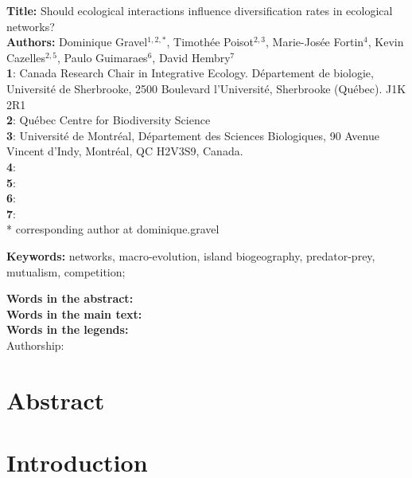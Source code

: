 \documentclass[12pt]{article}
\begin{document}
\linenumbers
\modulolinenumbers[1]

\textbf{Title:} Should ecological interactions influence diversification rates in ecological networks?\\

\textbf{Authors:} Dominique Gravel$^{1,2,*}$, Timothée Poisot$^{2,3}$, Marie-Josée Fortin$^{4}$, Kevin Cazelles$^{2,5}$, Paulo Guimaraes$^{6}$, David Hembry$^{7}$ \\

\textbf{1}: Canada Research Chair in Integrative Ecology. Département de
biologie, Université de Sherbrooke, 2500 Boulevard l'Université,
Sherbrooke (Québec). J1K 2R1\\
\textbf{2}: Québec Centre for Biodiversity Science\\
\textbf{3}: Université de Montréal, Département des Sciences Biologiques, 90 Avenue Vincent d’Indy, Montréal, QC H2V3S9, Canada.\\
\textbf{4}: \\
\textbf{5}: \\
\textbf{6}: \\
\textbf{7}: \\
* corresponding author at dominique.gravel\@usherbr

\textbf{Keywords:} networks, macro-evolution, island biogeography, predator-prey, mutualism, competition; 

\textbf{Words in the abstract: } \\ 
\textbf{Words in the main text: } \\
\textbf{Words in the legends: } \\

Authorship: 

\newpage
\doublespacing

\section*{Abstract}

\newpage

\section*{Introduction}
\end{document}
